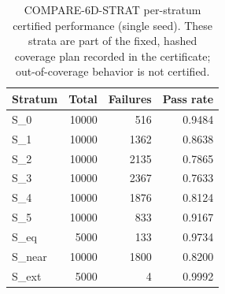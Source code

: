 \begin{table}[H]
\centering
\small
\setlength{\tabcolsep}{4pt}
\begin{tabular}{lrrr}
\toprule
Stratum & Total & Failures & Pass rate \\
\midrule
S\_0 & 10000 & 516 & 0.9484 \\
S\_1 & 10000 & 1362 & 0.8638 \\
S\_2 & 10000 & 2135 & 0.7865 \\
S\_3 & 10000 & 2367 & 0.7633 \\
S\_4 & 10000 & 1876 & 0.8124 \\
S\_5 & 10000 & 833 & 0.9167 \\
S\_eq & 5000 & 133 & 0.9734 \\
S\_near & 10000 & 1800 & 0.8200 \\
S\_ext & 5000 & 4 & 0.9992 \\
\bottomrule
\end{tabular}
\caption{COMPARE-6D-STRAT per-stratum certified performance (single seed). These strata are part of the fixed, hashed coverage plan recorded in the certificate; out-of-coverage behavior is not certified.}
\label{tab:compare6d_strata}
\end{table}
